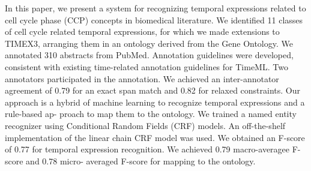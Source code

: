 In this paper, we present a system for recognizing temporal expressions related to cell cycle phase (CCP) concepts in biomedical literature. We identified 11 classes of cell cycle related temporal expressions, for which we made extensions to TIMEX3, arranging them in an ontology derived from the Gene Ontology. We annotated 310 abstracts from PubMed. Annotation guidelines were developed, consistent with existing time-related annotation guidelines for TimeML. Two annotators participated in the annotation. We achieved an inter-annotator agreement of 0.79 for an exact span match and 0.82 for relaxed constraints. Our approach is a hybrid of machine learning to recognize temporal expressions and a rule-based ap- proach to map them to the ontology. We trained a named entity recognizer using Conditional Random Fields (CRF) models. An off-the-shelf implementation of the linear chain CRF model was used. We obtained an F-score of 0.77 for temporal expression recognition. We achieved 0.79 macro-averagee F-score and 0.78 micro- averaged F-score for mapping to the ontology.
